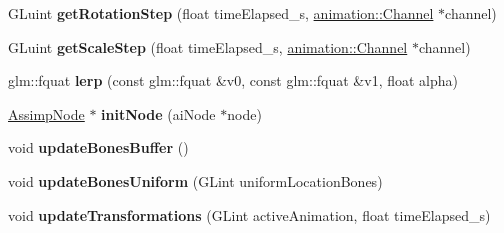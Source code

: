 \begin{DoxyCompactItemize}
\item 
\hypertarget{classfillwave_1_1manager_1_1BoneManager_ab508fc08681246625ca9ecc00c9041b1}{}G\+Luint {\bfseries get\+Rotation\+Step} (float time\+Elapsed\+\_\+s, \hyperlink{classfillwave_1_1animation_1_1Channel}{animation\+::\+Channel} $\ast$channel)\label{classfillwave_1_1manager_1_1BoneManager_ab508fc08681246625ca9ecc00c9041b1}

\item 
\hypertarget{classfillwave_1_1manager_1_1BoneManager_a4d4672ca0adb833a6a020cfac655cf62}{}G\+Luint {\bfseries get\+Scale\+Step} (float time\+Elapsed\+\_\+s, \hyperlink{classfillwave_1_1animation_1_1Channel}{animation\+::\+Channel} $\ast$channel)\label{classfillwave_1_1manager_1_1BoneManager_a4d4672ca0adb833a6a020cfac655cf62}

\item 
\hypertarget{classfillwave_1_1manager_1_1BoneManager_ae6e8ddff146f626909b8777c70229d27}{}glm\+::fquat {\bfseries lerp} (const glm\+::fquat \&v0, const glm\+::fquat \&v1, float alpha)\label{classfillwave_1_1manager_1_1BoneManager_ae6e8ddff146f626909b8777c70229d27}

\item 
\hypertarget{classfillwave_1_1manager_1_1BoneManager_a6286be8c76b9244ad1edfd866fb31c5f}{}\hyperlink{classfillwave_1_1manager_1_1AssimpNode}{Assimp\+Node} $\ast$ {\bfseries init\+Node} (ai\+Node $\ast$node)\label{classfillwave_1_1manager_1_1BoneManager_a6286be8c76b9244ad1edfd866fb31c5f}

\item 
\hypertarget{classfillwave_1_1manager_1_1BoneManager_a09eff893aab25b8407251429768363c9}{}void {\bfseries update\+Bones\+Buffer} ()\label{classfillwave_1_1manager_1_1BoneManager_a09eff893aab25b8407251429768363c9}

\item 
\hypertarget{classfillwave_1_1manager_1_1BoneManager_a996a798fc2e1f7e6b6eb18ebfdde6195}{}void {\bfseries update\+Bones\+Uniform} (G\+Lint uniform\+Location\+Bones)\label{classfillwave_1_1manager_1_1BoneManager_a996a798fc2e1f7e6b6eb18ebfdde6195}

\item 
\hypertarget{classfillwave_1_1manager_1_1BoneManager_a55f6856fa921771978b7f8c4001eeba3}{}void {\bfseries update\+Transformations} (G\+Lint active\+Animation, float time\+Elapsed\+\_\+s)\label{classfillwave_1_1manager_1_1BoneManager_a55f6856fa921771978b7f8c4001eeba3}

\end{DoxyCompactItemize}
